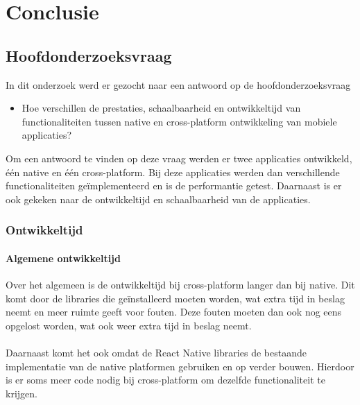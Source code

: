 
\chapter{Conclusie}%
\label{ch:conclusie}


\section{Hoofdonderzoeksvraag}
In dit onderzoek werd er gezocht naar een antwoord op de hoofdonderzoeksvraag 
\begin{itemize}
    \item Hoe verschillen de prestaties, schaalbaarheid en ontwikkeltijd van functionaliteiten tussen native en cross-platform ontwikkeling van mobiele applicaties?
\end{itemize}
Om een antwoord te vinden op deze vraag werden er twee applicaties ontwikkeld, één native en één cross-platform.
Bij deze applicaties werden dan verschillende functionaliteiten geïmplementeerd en is de performantie getest. 
Daarnaast is er ook gekeken naar de ontwikkeltijd en schaalbaarheid van de applicaties. 

\subsection{Ontwikkeltijd}
\subsubsection{Algemene ontwikkeltijd}
Over het algemeen is de ontwikkeltijd bij cross-platform langer dan bij native.
Dit komt door de libraries die geïnstalleerd moeten worden, wat extra tijd in beslag neemt en meer 
ruimte geeft voor fouten. Deze fouten moeten dan ook nog eens opgelost worden, wat ook weer extra tijd in beslag neemt.
\\\\
Daarnaast komt het ook omdat de React Native libraries de bestaande implementatie van de 
native platformen gebruiken en op verder bouwen. Hierdoor is er soms meer code nodig bij 
cross-platform om dezelfde functionaliteit te krijgen.

